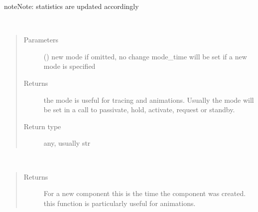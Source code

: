 \documentclass[letterpaper,10pt,english]{sphinxmanual}
\begin{document}
\begin{fulllineitems}
\begin{fulllineitems}
\begin{quote}
\begin{description}
\end{description}\end{quote}

\begin{sphinxadmonition}{note}{Note:}
statistics are updated accordingly
\end{sphinxadmonition}

\end{fulllineitems}


\begin{fulllineitems}
\label{\detokenize{Reference:salabim.Component.mode}}~\begin{quote}\begin{description}
\item[{Parameters}] \leavevmode
{} (\sphinxstyleliteralemphasis{\sphinxupquote{, }}) \textendash{} new mode 
if omitted, no change 
mode\_time will be set if a new mode is specified

\item[{Returns}] \leavevmode
{} \textendash{} the mode is useful for tracing and animations. 
Usually the mode will be set in a call to passivate, hold, activate, request or standby.

\item[{Return type}] \leavevmode
any, usually str

\end{description}\end{quote}

\end{fulllineitems}


\begin{fulllineitems}
\label{\detokenize{Reference:salabim.Component.mode_time}}~\begin{quote}\begin{description}
\item[{Returns}] \leavevmode
{} \textendash{} For a new component this is
the time the component was created. 
this function is particularly useful for animations.


\end{description}
\end{quote}
\end{fulllineitems}
\end{fulllineitems}
\end{document}
